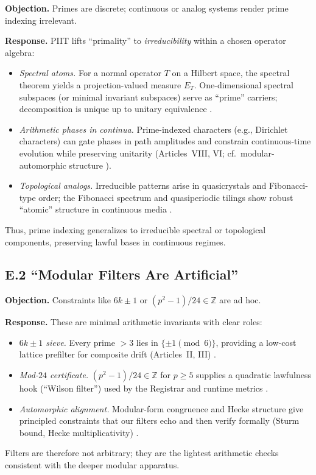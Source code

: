 \documentclass[12pt]{amsart}
\theoremstyle{plain}
\begin{document}
\textbf{Objection.} Primes are discrete; continuous or analog systems render prime indexing irrelevant.

\textbf{Response.} PIIT lifts “primality” to \emph{irreducibility} within a chosen operator algebra:
\begin{itemize}
  \item \textit{Spectral atoms.} For a normal operator $T$ on a Hilbert space, the spectral theorem yields a projection-valued measure $E_T$. One-dimensional spectral subspaces (or minimal invariant subspaces) serve as “prime” carriers; decomposition is unique up to unitary equivalence \cite{rudin1991functional,conway1990functional,lax2002functional}.
  \item \textit{Arithmetic phases in continua.} Prime-indexed characters (e.g., Dirichlet characters) can gate phases in path amplitudes and constrain continuous-time evolution while preserving unitarity (Articles~VIII, VI; cf.\ modular-automorphic structure \cite{diamond2005first,iwaniec2002spectral}).
  \item \textit{Topological analogs.} Irreducible patterns arise in quasicrystals and Fibonacci-type order; the Fibonacci spectrum and quasiperiodic tilings show robust “atomic” structure in continuous media \cite{steinhardt1987physics}.
\end{itemize}
Thus, prime indexing generalizes to irreducible spectral or topological components, preserving lawful bases in continuous regimes.

\subsection*{E.2 “Modular Filters Are Artificial”}

\textbf{Objection.} Constraints like $6k\pm1$ or $(p^2-1)/24\in\mathbb{Z}$ are ad hoc.

\textbf{Response.} These are minimal arithmetic invariants with clear roles:
\begin{itemize}
  \item \textit{$6k\pm1$ sieve.} Every prime $>3$ lies in $\{\pm1\!\!\pmod{6}\}$, providing a low-cost lattice prefilter for composite drift (Articles~II, III) \cite{hardy2008introduction}.
  \item \textit{Mod-$24$ certificate.} $(p^2-1)/24\in\mathbb{Z}$ for $p\ge5$ supplies a quadratic lawfulness hook (“Wilson filter”) used by the Registrar and runtime metrics \cite[Ch.~5]{hardy2008introduction}.
  \item \textit{Automorphic alignment.} Modular-form congruence and Hecke structure give principled constraints that our filters echo and then verify formally (Sturm bound, Hecke multiplicativity) \cite{sturm1987congruence,diamond2005first,serre1973course,iwaniec2002spectral}.
\end{itemize}
Filters are therefore not arbitrary; they are the lightest arithmetic checks consistent with the deeper modular apparatus.
\end{document}
